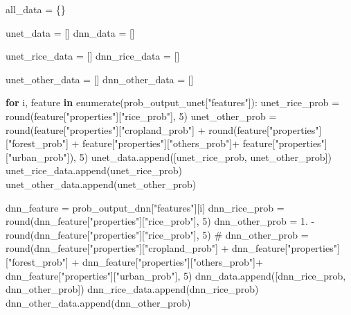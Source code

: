 \documentclass[
  letterpaper,
  DIV=11,
  numbers=noendperiod]{scrreprt}
\newenvironment{Shaded}{\begin{snugshade}}{\end{snugshade}}
\newcommand{\BuiltInTok}[1]{\textcolor[rgb]{0.00,0.23,0.31}{#1}}
\newcommand{\CommentTok}[1]{\textcolor[rgb]{0.37,0.37,0.37}{#1}}
\newcommand{\ControlFlowTok}[1]{\textcolor[rgb]{0.00,0.23,0.31}{\textbf{#1}}}
\newcommand{\DecValTok}[1]{\textcolor[rgb]{0.68,0.00,0.00}{#1}}
\newcommand{\FloatTok}[1]{\textcolor[rgb]{0.68,0.00,0.00}{#1}}
\newcommand{\KeywordTok}[1]{\textcolor[rgb]{0.00,0.23,0.31}{\textbf{#1}}}
\newcommand{\NormalTok}[1]{\textcolor[rgb]{0.00,0.23,0.31}{#1}}
\newcommand{\OperatorTok}[1]{\textcolor[rgb]{0.37,0.37,0.37}{#1}}
\newcommand{\StringTok}[1]{\textcolor[rgb]{0.13,0.47,0.30}{#1}}
\begin{document}
\begin{Shaded}
\begin{Highlighting}[]
\NormalTok{all\_data }\OperatorTok{=}\NormalTok{ \{\}}

\NormalTok{unet\_data }\OperatorTok{=}\NormalTok{ []}
\NormalTok{dnn\_data }\OperatorTok{=}\NormalTok{ []}

\NormalTok{unet\_rice\_data }\OperatorTok{=}\NormalTok{ []}
\NormalTok{dnn\_rice\_data }\OperatorTok{=}\NormalTok{ []}

\NormalTok{unet\_other\_data }\OperatorTok{=}\NormalTok{ []}
\NormalTok{dnn\_other\_data }\OperatorTok{=}\NormalTok{ []}

\ControlFlowTok{for}\NormalTok{ i, feature }\KeywordTok{in} \BuiltInTok{enumerate}\NormalTok{(prob\_output\_unet[}\StringTok{"features"}\NormalTok{]):}
\NormalTok{    unet\_rice\_prob }\OperatorTok{=} \BuiltInTok{round}\NormalTok{(feature[}\StringTok{"properties"}\NormalTok{][}\StringTok{"rice\_prob"}\NormalTok{], }\DecValTok{5}\NormalTok{)}
\NormalTok{    unet\_other\_prob }\OperatorTok{=} \BuiltInTok{round}\NormalTok{(feature[}\StringTok{"properties"}\NormalTok{][}\StringTok{"cropland\_prob"}\NormalTok{] }\OperatorTok{+} \BuiltInTok{round}\NormalTok{(feature[}\StringTok{"properties"}\NormalTok{][}\StringTok{"forest\_prob"}\NormalTok{] }\OperatorTok{+}\NormalTok{ feature[}\StringTok{"properties"}\NormalTok{][}\StringTok{"others\_prob"}\NormalTok{]}\OperatorTok{+}\NormalTok{ feature[}\StringTok{"properties"}\NormalTok{][}\StringTok{"urban\_prob"}\NormalTok{]), }\DecValTok{5}\NormalTok{)}
\NormalTok{    unet\_data.append([unet\_rice\_prob, unet\_other\_prob])}
\NormalTok{    unet\_rice\_data.append(unet\_rice\_prob)}
\NormalTok{    unet\_other\_data.append(unet\_other\_prob)}

\NormalTok{    dnn\_feature }\OperatorTok{=}\NormalTok{ prob\_output\_dnn[}\StringTok{"features"}\NormalTok{][i]}
\NormalTok{    dnn\_rice\_prob }\OperatorTok{=} \BuiltInTok{round}\NormalTok{(dnn\_feature[}\StringTok{"properties"}\NormalTok{][}\StringTok{"rice\_prob"}\NormalTok{], }\DecValTok{5}\NormalTok{)}
\NormalTok{    dnn\_other\_prob }\OperatorTok{=} \FloatTok{1.} \OperatorTok{{-}} \BuiltInTok{round}\NormalTok{(dnn\_feature[}\StringTok{"properties"}\NormalTok{][}\StringTok{"rice\_prob"}\NormalTok{], }\DecValTok{5}\NormalTok{)}
    \CommentTok{\# dnn\_other\_prob = round(dnn\_feature["properties"]["cropland\_prob"] + dnn\_feature["properties"]["forest\_prob"] + dnn\_feature["properties"]["others\_prob"]+ dnn\_feature["properties"]["urban\_prob"], 5)}
\NormalTok{    dnn\_data.append([dnn\_rice\_prob, dnn\_other\_prob])}
\NormalTok{    dnn\_rice\_data.append(dnn\_rice\_prob)}
\NormalTok{    dnn\_other\_data.append(dnn\_other\_prob)}
\end{Highlighting}
\end{Shaded}
\end{document}
